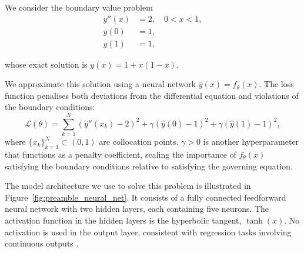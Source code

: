 We consider the boundary value problem
\begin{equation}\label{eq:intro_problem}
    \begin{aligned}
    y''(x) &= 2, \quad 0 < x < 1, \\
    y(0) &= 1, \\
    y(1) &= 1,
    \end{aligned}
\end{equation}

whose exact solution is \( y(x) = 1 + x(1 - x) \).

We approximate this solution using a neural network \( \hat{y}(x) = f_\theta(x) \). 
The loss function penalises both 
deviations from the differential equation and violations of the boundary conditions:
\begin{equation}
\label{eq:prelim_loss_func}
\mathcal{L}(\theta) = \sum_{k=1}^N \left( \hat{y}''(x_k) - 2 \right)^2 
+ \gamma \left( \hat{y}(0) - 1 \right)^2 
+ \gamma \left( \hat{y}(1) - 1 \right)^2,
\end{equation}
where \( \{x_k\}_{k=1}^N \subset (0,1) \) are collocation points. \( \gamma > 0 \) is another 
hyperparameter that functions as a penalty coefficient, scaling the importance of $f_\theta(x)$
satisfying the boundary conditions relative to satisfying the governing equation.

The model architecture we use to solve this problem is illustrated in 
Figure~\ref{fig:preamble_neural_net}. It consists of a 
fully connected feedforward neural network with two hidden layers, each containing five neurons. 
The activation function in the hidden layers is the hyperbolic tangent, \( \tanh(x) \). 
No activation is used in the output layer, consistent 
with regression tasks involving continuous outputs \cite{goodfellow2016deep}.


